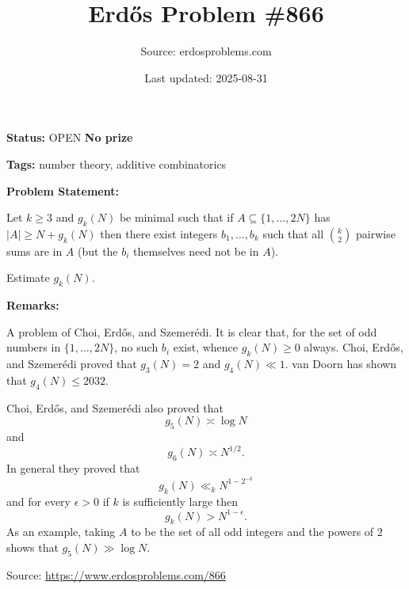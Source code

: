\documentclass{article}
\title{Erd\H{o}s Problem \#866}
\date{Last updated: 2025-08-31}
\author{Source: erdosproblems.com}
\begin{document}
\maketitle

\noindent\textbf{Status:} OPEN \quad \textbf{No prize}

\noindent\textbf{Tags:} number theory, additive combinatorics

\medskip
\noindent\textbf{Problem Statement:}

Let $k\geq 3$ and $g_k(N)$ be minimal such that if $A\subseteq \{1,\ldots,2N\}$ has $\lvert A\rvert \geq N+g_k(N)$ then there exist integers $b_1,\ldots,b_k$ such that all $\binom{k}{2}$ pairwise sums are in $A$ (but the $b_i$ themselves need not be in $A$).

Estimate $g_k(N)$.

\bigskip
\noindent\textbf{Remarks:}

A problem of Choi, Erd\H{o}s, and Szemer\'{e}di. It is clear that, for the set of odd numbers in $\{1,\ldots,2N\}$, no such $b_i$ exist, whence $g_k(N)\geq 0$ always. Choi, Erd\H{o}s, and Szemer\'{e}di proved that $g_3(N)=2$ and $g_4(N) \ll 1$. van Doorn has shown that $g_4(N)\leq 2032$.

Choi, Erd\H{o}s, and Szemer\'{e}di also proved that\[g_5(N)\asymp \log N\]and\[g_6(N)\asymp N^{1/2}.\]In general they proved that\[g_k(N) \ll_k N^{1-2^{-k}}\]and for every $\epsilon>0$ if $k$ is sufficiently large then\[g_k(N) > N^{1-\epsilon}.\]As an example, taking $A$ to be the set of all odd integers and the powers of $2$ shows that $g_5(N)\gg \log N$.

\bigskip
\noindent\small{Source: \url{https://www.erdosproblems.com/866}}
\end{document}
